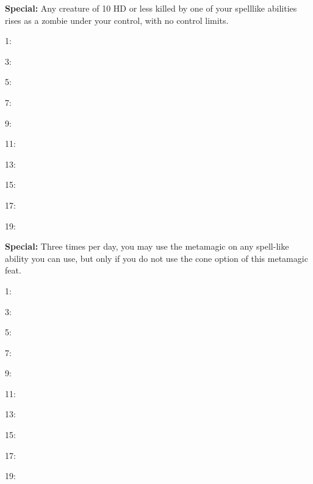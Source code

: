 \begin{multicols}{2}

\begin{description*}
\item {}
\item \textbf{Special:} Any creature of 10 HD or less killed by one of your spelllike abilities rises as a zombie under your control, with no control limits.
	\item[1:] 
	\item[3:] 
	\item[5:] 
	\item[7:] 
	\item[9:] 
	\item[11:] 
	\item[13:] 
	\item[15:] 
	\item[17:] 
	\item[19:] 
\end{description*}

\begin{description*}
\item {}
\item \textbf{Special:} Three times per day, you may use the  metamagic on any spell-like ability you can use, but only if you do not use the cone option of this metamagic feat.
	\item[1:] 
	\item[3:] 
	\item[5:] 
	\item[7:] 
	\item[9:] 
	\item[11:] 
	\item[13:] 
	\item[15:] 
	\item[17:] 
	\item[19:] 
\end{description*}


\end{multicols}
